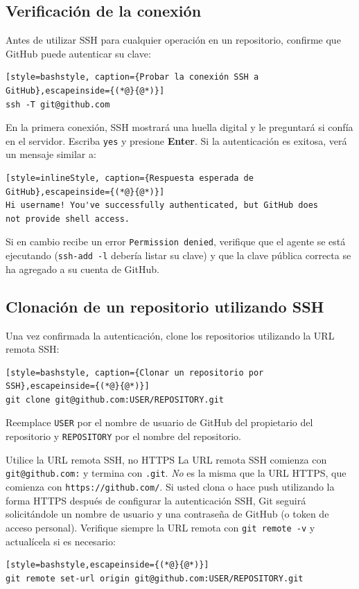 \subsection{Verificación de la conexión}

Antes de utilizar SSH para cualquier operación en un repositorio, confirme que GitHub puede autenticar su clave:

\begin{lstlisting}[style=bashstyle, caption={Probar la conexión SSH a GitHub},escapeinside={(*@}{@*)}]
ssh -T git@github.com
\end{lstlisting}

En la primera conexión, SSH mostrará una huella digital y le preguntará si confía en el servidor. Escriba \texttt{yes} y presione \textbf{Enter}. Si la autenticación es exitosa, verá un mensaje similar a:

\begin{lstlisting}[style=inlineStyle, caption={Respuesta esperada de GitHub},escapeinside={(*@}{@*)}]
Hi username! You've successfully authenticated, but GitHub does
not provide shell access.
\end{lstlisting}

Si en cambio recibe un error \texttt{Permission denied}, verifique que el agente se está ejecutando (\texttt{ssh-add -l} debería listar su clave) y que la clave pública correcta se ha agregado a su cuenta de GitHub.

\subsection{Clonación de un repositorio utilizando SSH}

Una vez confirmada la autenticación, clone los repositorios utilizando la URL remota SSH:

\begin{lstlisting}[style=bashstyle, caption={Clonar un repositorio por SSH},escapeinside={(*@}{@*)}]
git clone git@github.com:USER/REPOSITORY.git
\end{lstlisting}

Reemplace \texttt{USER} por el nombre de usuario de GitHub del propietario del repositorio y \texttt{REPOSITORY} por el nombre del repositorio.

\begin{warningbox}{Utilice la URL remota SSH, no HTTPS}
La URL remota SSH comienza con \texttt{git@github.com:} y termina con \texttt{.git}. \emph{No} es la misma que la URL HTTPS, que comienza con \texttt{https://github.com/}. Si usted clona o hace push utilizando la forma HTTPS después de configurar la autenticación SSH, Git seguirá solicitándole un nombre de usuario y una contraseña de GitHub (o token de acceso personal). Verifique siempre la URL remota con \texttt{git remote -v} y actualícela si es necesario:

\begin{lstlisting}[style=bashstyle,escapeinside={(*@}{@*)}]
git remote set-url origin git@github.com:USER/REPOSITORY.git
\end{lstlisting}
\end{warningbox}

